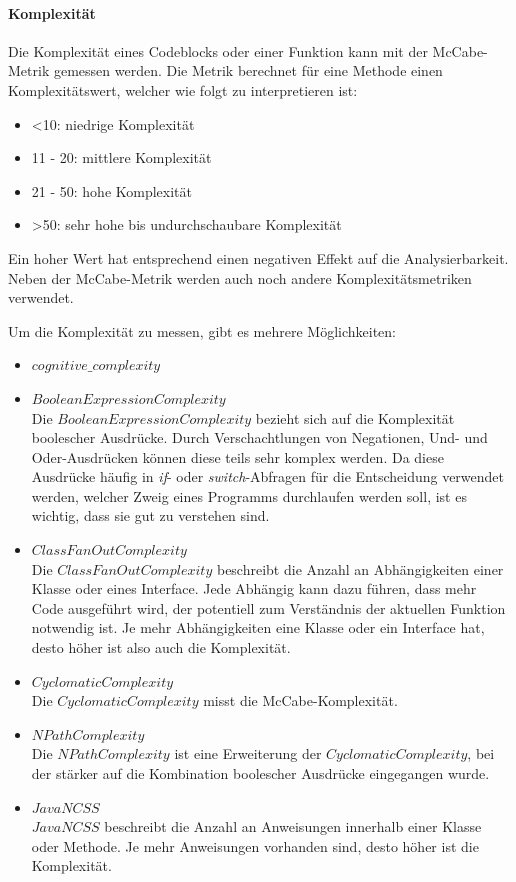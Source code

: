 \documentclass[
	oneside,  %
	ngerman, 
	final, 
	11pt, 
	a4paper, 
	1.1headlines, 
	headinclude=false, 
	footinclude=false, 
	mpinclude=false, 
	pagesize, 
	onecolumn, 
	titlepage, 
	parskip=half, 
	headsepline, 
	chapterprefix=false, 
	version=first, 
	listof=totoc, 
	bibliography=totoc, 
	toc=graduated, 
	fleqn
]{scrbook}
\begin{document}
\paragraph{Komplexität}
Die Komplexität eines Codeblocks oder einer Funktion kann mit der McCabe-Metrik gemessen werden.
Die Metrik berechnet für eine Methode einen Komplexitätswert, welcher wie folgt zu interpretieren ist:

\begin{itemize}
	\item <10: niedrige Komplexität
	\item 11 - 20: mittlere Komplexität
	\item 21 - 50: hohe Komplexität
	\item >50: sehr hohe bis undurchschaubare Komplexität
\end{itemize}

Ein hoher Wert hat entsprechend einen negativen Effekt auf die Analysierbarkeit.
Neben der McCabe-Metrik werden auch noch andere Komplexitätsmetriken verwendet.

Um die Komplexität zu messen, gibt es mehrere Möglichkeiten:

\begin{itemize}
	\item $cognitive\_complexity$
	\item $BooleanExpressionComplexity$\\
	Die $BooleanExpressionComplexity$ bezieht sich auf die Komplexität boolescher Ausdrücke.
	Durch Verschachtlungen von Negationen, Und- und Oder-Ausdrücken können diese teils sehr komplex werden.
	Da diese Ausdrücke häufig in \textit{if}- oder \textit{switch}-Abfragen für die Entscheidung verwendet werden, welcher Zweig eines Programms durchlaufen werden soll, ist es wichtig, dass sie gut zu verstehen sind.
	\item $ClassFanOutComplexity$\\
	Die $ClassFanOutComplexity$ beschreibt die Anzahl an Abhängigkeiten einer Klasse oder eines Interface.
	Jede Abhängig kann dazu führen, dass mehr Code ausgeführt wird, der potentiell zum Verständnis der aktuellen Funktion notwendig ist.
	Je mehr Abhängigkeiten eine Klasse oder ein Interface hat, desto höher ist also auch die Komplexität.
	\item $CyclomaticComplexity$\\
	Die $CyclomaticComplexity$ misst die McCabe-Komplexität.
	\item $NPathComplexity$\\
	Die $NPathComplexity$ ist eine Erweiterung der $CyclomaticComplexity$, bei der stärker auf die Kombination boolescher Ausdrücke eingegangen wurde.
	\item $JavaNCSS$\\
	$JavaNCSS$ beschreibt die Anzahl an Anweisungen innerhalb einer Klasse oder Methode.
	Je mehr Anweisungen vorhanden sind, desto höher ist die Komplexität.
\end{itemize}
\end{document}
